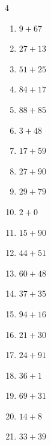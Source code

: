 \begin{multicols}{4}
\begin{enumerate}
  \item $9+67$
        \phantom{$=76$}

  \item $27+13$
        \phantom{$=40$}

  \item $51+25$
        \phantom{$=76$}

  \item $84+17$
        \phantom{$=101$}

  \item $88+85$
        \phantom{$=173$}

  \item $3+48$
        \phantom{$=51$}

  \item $17+59$
        \phantom{$=76$}

  \item $27+90$
        \phantom{$=117$}

  \item $29+79$
        \phantom{$=108$}

  \item $2+0$
        \phantom{$=2$}

  \item $15+90$
        \phantom{$=105$}

\columnbreak %

  \item $44+51$
        \phantom{$=95$}

  \item $60+48$
        \phantom{$=108$}

  \item $37+35$
        \phantom{$=72$}

  \item $94+16$
        \phantom{$=110$}

  \item $21+30$
        \phantom{$=51$}

  \item $24+91$
        \phantom{$=115$}

  \item $36+1$
        \phantom{$=37$}

  \item $69+31$
        \phantom{$=100$}

  \item $14+8$
        \phantom{$=22$}

  \item $33+39$
        \phantom{$=72$}


\end{enumerate}
\end{multicols}
